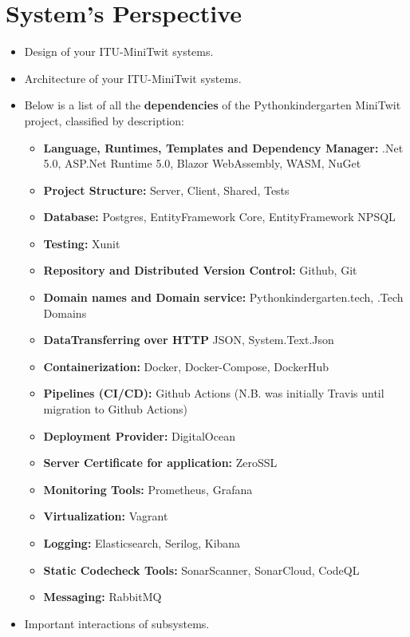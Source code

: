 \section{System's Perspective}

\begin{itemize}
  \item Design of your ITU-MiniTwit systems.

  \item Architecture of your ITU-MiniTwit systems.
  \item Below is a list of all the \textbf{dependencies} of the Pythonkindergarten MiniTwit project, classified by description:
    \begin{itemize}
      \item \textbf{Language, Runtimes, Templates and Dependency Manager:}
      .Net 5.0, ASP.Net Runtime 5.0, Blazor WebAssembly, WASM, NuGet
      \item \textbf{Project Structure:} Server, Client, Shared, Tests
      \item \textbf{Database:} Postgres, EntityFramework Core, EntityFramework NPSQL
      \item \textbf{Testing:} Xunit
      \item \textbf{Repository and Distributed Version Control:} Github, Git
      \item \textbf{Domain names and Domain service:} Pythonkindergarten.tech, .Tech Domains
      \item \textbf{DataTransferring over HTTP} JSON, System.Text.Json
      \item \textbf{Containerization:} Docker, Docker-Compose, DockerHub
      \item \textbf{Pipelines (CI/CD):} Github Actions (N.B. was initially Travis until migration to Github Actions)
      \item \textbf{Deployment Provider:} DigitalOcean
      \item \textbf{Server Certificate for application:} ZeroSSL
      \item \textbf{Monitoring Tools:} Prometheus, Grafana
      \item \textbf{Virtualization:} Vagrant
      \item \textbf{Logging:} Elasticsearch, Serilog, Kibana
      \item \textbf{Static Codecheck Tools:} SonarScanner, SonarCloud, CodeQL
      \item \textbf{Messaging:} RabbitMQ
    \end{itemize}
  \item Important interactions of subsystems.


\end{itemize}
